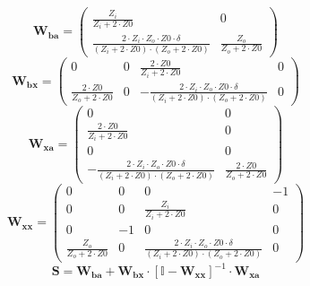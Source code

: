 \[ \mathbf{W_{ba}} = \left(\begin{smallmatrix} \frac{Z_i}{Z_i+2\cdot Z0} & 0 \\ \frac{2\cdot Z_i\cdot Z_o\cdot Z0\cdot \delta}{\left(Z_i+2\cdot Z0\right)\cdot\left(Z_o+2\cdot Z0\right)} & \frac{Z_o}{Z_o+2\cdot Z0} \end{smallmatrix}\right) \]
\[ \mathbf{W_{bx}} = \left(\begin{smallmatrix} 0 & 0 & \frac{2\cdot Z0}{Z_i+2\cdot Z0} & 0 \\ \frac{2\cdot Z0}{Z_o+2\cdot Z0} & 0 & -\frac{2\cdot Z_i\cdot Z_o\cdot Z0\cdot \delta}{\left(Z_i+2\cdot Z0\right)\cdot\left(Z_o+2\cdot Z0\right)} & 0 \end{smallmatrix}\right) \]
\[ \mathbf{W_{xa}} = \left(\begin{smallmatrix} 0 & 0 \\ \frac{2\cdot Z0}{Z_i+2\cdot Z0} & 0 \\ 0 & 0 \\ -\frac{2\cdot Z_i\cdot Z_o\cdot Z0\cdot \delta}{\left(Z_i+2\cdot Z0\right)\cdot\left(Z_o+2\cdot Z0\right)} & \frac{2\cdot Z0}{Z_o+2\cdot Z0} \end{smallmatrix}\right) \]
\[ \mathbf{W_{xx}} = \left(\begin{smallmatrix} 0 & 0 & 0 & -1 \\ 0 & 0 & \frac{Z_i}{Z_i+2\cdot Z0} & 0 \\ 0 & -1 & 0 & 0 \\ \frac{Z_o}{Z_o+2\cdot Z0} & 0 & \frac{2\cdot Z_i\cdot Z_o\cdot Z0\cdot \delta}{\left(Z_i+2\cdot Z0\right)\cdot\left(Z_o+2\cdot Z0\right)} & 0 \end{smallmatrix}\right) \]
\[ \mathbf{S}=\mathbf{W_{ba}}+\mathbf{W_{bx}}\cdot\left[ \mathbb{I}  -\mathbf{W_{xx}}\right]^{-1}\cdot\mathbf{W_{xa}} \]
